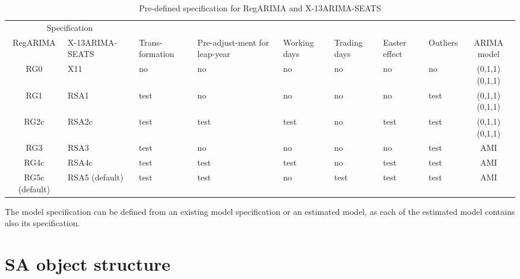 \documentclass[article]{jss}
\begin{document}
\begin{table}

\caption{\label{tab:unnamed-chunk-3}\label{tab:pre_def_x13}Pre-defined specification for RegARIMA and X-13ARIMA-SEATS}
\centering
\fontsize{7}{9}\selectfont
\begin{tabular}[t]{c>{\centering\arraybackslash}p{1.7cm}>{\centering\arraybackslash}p{}>{\centering\arraybackslash}p{1.4cm}>{\centering\arraybackslash}p{0.9cm}>{\centering\arraybackslash}p{0.9cm}>{\centering\arraybackslash}p{0.9cm}>{\centering\arraybackslash}p{0.9cm}c}
\toprule
\multicolumn{2}{c}{Specification} & \multicolumn{1}{c}{} \\
\cmidrule(l{2pt}r{2pt}){1-2}
RegARIMA & X-13ARIMA-SEATS & Trans-formation & Pre-adjust-ment for leap-year & Working days & Trading days & Easter effect & Outliers & ARIMA model\\
\midrule
RG0 & X11 & no & no & no & no & no & no & (0,1,1)(0,1,1)\\
RG1 & RSA1 & test & no & no & no & no & test & (0,1,1)(0,1,1)\\
RG2c & RSA2c & test & test & test & no & test & test & (0,1,1)(0,1,1)\\
RG3 & RSA3 & test & no & no & no & no & test & AMI\\
RG4c & RSA4c & test & test & test & no & test & test & AMI\\
RG5c (default) & RSA5 (default) & test & test & no & test & test & test & AMI\\
\bottomrule
\end{tabular}
\end{table}

The model specification can be defined from an existing model
specification or an estimated model, as each of the estimated model
contains also its specification.

\hypertarget{sa-object-structure}{%
\section{SA object structure}\label{sa-object-structure}}

\begingroup\fontsize{7}{9}\selectfont
\end{document}
